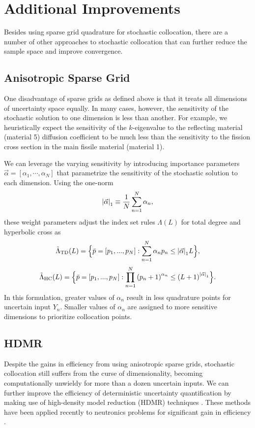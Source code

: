 \documentclass{mc2015}
\begin{document}
\section{Additional Improvements}
Besides using sparse grid quadrature for stochastic collocation, there are a number of other approaches to stochastic collocation that can further reduce the sample space and improve convergence.

\subsection{Anisotropic Sparse Grid}
One disadvantage of sparse grids as defined above is that it treats all dimensions of uncertainty space equally.  In many cases, however, the sensitivity of the stochastic solution to one dimension is less than another.  For example, we heuristically expect the sensitivity of the $k$-eigenvalue to the reflecting material (material 5) diffusion coefficient to be much less than the sensitivity to the fission cross section in the main fissile material (material 1).  

We can leverage the varying sensitivity by introducing importance parameters $\vec\alpha=[\alpha_1,\cdots,\alpha_N]$ that parametrize the sensitivity of the stochastic solution to each dimension.  Using the one-norm
\begin{equation}
\qty|\vec\alpha|_1\equiv\frac{1}{N}\sum_{n=1}^N \alpha_n,
\end{equation}
these weight parameters adjust the index set rules $\Lambda(L)$ for total degree and hyperbolic cross as
\begin{equation}
\tilde\Lambda_\text{TD}(L)=\Big\{\bar p=[p_1,...,p_N]:\sum_{n=1}^N \alpha_n p_n \leq \qty|\vec\alpha|_1 L \Big\},
\end{equation}
\begin{equation}
\tilde\Lambda_\text{HC}(L)=\Big\{\bar p=[p_1,...,p_N]:\prod_{n=1}^N \qty(p_n+1)^{\alpha_n} \leq \qty(L+1)^{\qty|\vec\alpha|_1} \Big\}.
\end{equation}
In this formulation, greater values of $\alpha_n$ result in less quadrature points for uncertain input $Y_n$.  Smaller values of $\alpha_n$ are assigned to more sensitive dimensions to prioritize collocation points.


\subsection{HDMR}
Despite the gains in efficiency from using anisotropic sparse grids, stochastic collocation still suffers from the curse of dimensionality, becoming computationally unwieldy for more than a dozen uncertain inputs.  We can further improve the efficiency of deterministic uncertainty quantification by making use of high-density model reduction (HDMR) techniques \cite{hdmr}.  These methods have been applied recently to neutronics problems for significant gain in efficiency \cite{hdmr_neutron}.
\end{document}
